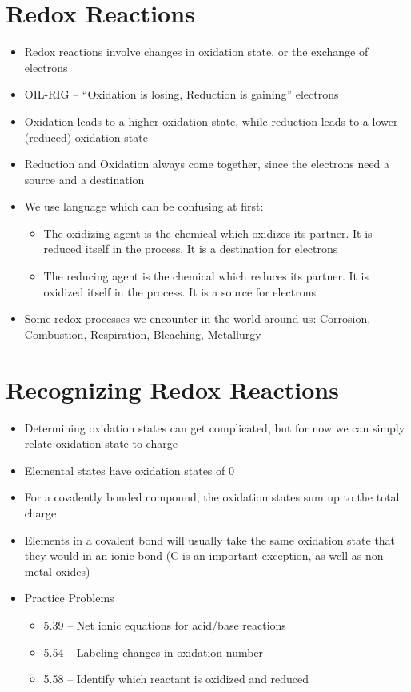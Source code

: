 \documentclass[12pt, openany, letterpaper]{memoir}
\begin{document}
\section{Redox Reactions}
\begin{itemize}
	\item Redox reactions involve changes in oxidation state, or the exchange of electrons
	\item OIL-RIG -- ``Oxidation is losing, Reduction is gaining'' electrons
	\item Oxidation leads to a higher oxidation state, while reduction leads to a lower (reduced) oxidation state
	\item Reduction and Oxidation always come together, since the electrons need a source and a destination
	\item We use language which can be confusing at first:
	\begin{itemize}
		\item The oxidizing agent is the chemical which oxidizes its partner. It is reduced itself in the process. It is a destination for electrons
		\item The reducing agent is the chemical which reduces its partner. It is oxidized itself in the process. It is a source for electrons
	\end{itemize}	
	\item Some redox processes we encounter in the world around us: Corrosion, Combustion, Respiration, Bleaching, Metallurgy
\end{itemize}
\section{Recognizing Redox Reactions}
\begin{itemize}
	\item Determining oxidation states can get complicated, but for now we can simply relate oxidation state to charge
	\item Elemental states have oxidation states of 0
	\item For a covalently bonded compound, the oxidation states sum up to the total charge
	\item Elements in a covalent bond will usually take the same oxidation state that they would in an ionic bond (C is an important exception, as well as non-metal oxides)
	\item Practice Problems
	\begin{itemize}	
		\item 5.39 -- Net ionic equations for acid/base reactions
		\item 5.54 -- Labeling changes in oxidation number
		\item 5.58 -- Identify which reactant is oxidized and reduced
	\end{itemize}
\end{itemize}
\end{document}
